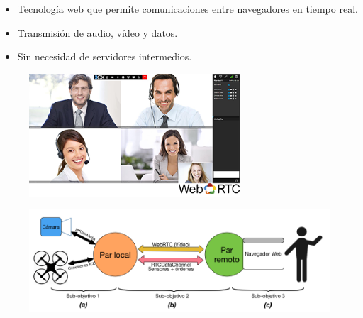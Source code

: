 \documentclass[notes,slidesec,a4]{seminar}
\begin{document}


\begin{hslide}
\begin{itemize}
\item Tecnología web que permite comunicaciones entre navegadores en tiempo real.
\item Transmisión de audio, vídeo y datos.
\item Sin necesidad de servidores intermedios.
\end{itemize}
\begin{center}
\begin{figure}
\includegraphics[width=0.7\textwidth]{img/webrtc}
\end{figure}
\end{center}
\end{hslide}



\begin{hslide}
\begin{center}
\begin{figure}
\includegraphics[width=1.1\textwidth]{img/esquema_general}
\end{figure}
\end{center}
\end{hslide}



\end{document}
